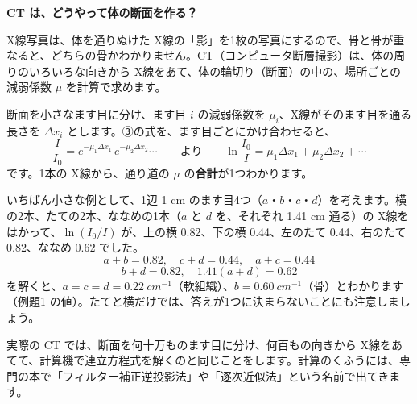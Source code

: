 \begin{motto}[4]
\textbf{CT は、どうやって体の断面を作る？}\par
X線写真は、体を通りぬけた X線の「影」を1枚の写真にするので、骨と骨が重なると、どちらの骨かわかりません。CT（コンピュータ断層撮影）は、体の周りのいろいろな向きから X線をあて、体の輪切り（断面）の中の、場所ごとの減弱係数 $\mu$ を計算で求めます。

断面を小さなます目に分け、ます目 $i$ の減弱係数を $\mu_i$、X線がそのます目を通る長さを $\Delta x_i$ とします。③の式を、ます目ごとにかけ合わせると、
\[ \frac{I}{I_0}=e^{-\mu_1\Delta x_1}\,e^{-\mu_2\Delta x_2}\cdots \qquad\text{より}\qquad \ln\frac{I_0}{I}=\mu_1\Delta x_1+\mu_2\Delta x_2+\cdots \]
です。1本の X線から、通り道の $\mu$ の\textbf{合計}が1つわかります。

\noindent\begin{minipage}[c]{0.60\linewidth}\raggedright
いちばん小さな例として、1辺 1 cm のます目4つ（$a$・$b$・$c$・$d$）を考えます。横の2本、たての2本、ななめの1本（$a$ と $d$ を、それぞれ 1.41 cm 通る）の X線をはかって、$\ln(I_0/I)$ が、上の横 0.82、下の横 0.44、左のたて 0.44、右のたて 0.82、ななめ 0.62 でした。
\[ a+b=0.82,\quad c+d=0.44,\quad a+c=0.44 \]
\[ b+d=0.82,\quad 1.41(a+d)=0.62 \]
を解くと、$a=c=d=\qty{0.22}{cm^{-1}}$（軟組織）、$b=\qty{0.60}{cm^{-1}}$（骨）とわかります（例題1 の値）。たてと横だけでは、答えが1つに決まらないことにも注意しましょう。
\end{minipage}\hfill
\begin{minipage}[c]{0.36\linewidth}\centering
{}
\end{minipage}
\par\vspace{2pt}
実際の CT では、断面を何十万ものます目に分け、何百もの向きから X線をあてて、計算機で連立方程式を解くのと同じことをします。計算のくふうには、専門の本で「フィルター補正逆投影法」や「逐次近似法」という名前で出てきます。
\end{motto}

